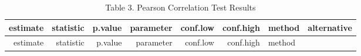 \documentclass[
]{article}
\begin{document}
\begin{longtable}[]{@{}rrrrrrll@{}}
\caption{Table 3. Pearson Correlation Test Results}\tabularnewline
\toprule
\begin{minipage}[b]{0.07\columnwidth}\raggedleft
estimate\strut
\end{minipage} & \begin{minipage}[b]{0.07\columnwidth}\raggedleft
statistic\strut
\end{minipage} & \begin{minipage}[b]{0.06\columnwidth}\raggedleft
p.value\strut
\end{minipage} & \begin{minipage}[b]{0.07\columnwidth}\raggedleft
parameter\strut
\end{minipage} & \begin{minipage}[b]{0.07\columnwidth}\raggedleft
conf.low\strut
\end{minipage} & \begin{minipage}[b]{0.07\columnwidth}\raggedleft
conf.high\strut
\end{minipage} & \begin{minipage}[b]{0.27\columnwidth}\raggedright
method\strut
\end{minipage} & \begin{minipage}[b]{0.09\columnwidth}\raggedright
alternative\strut
\end{minipage}\tabularnewline
\midrule
\endfirsthead
\toprule
\begin{minipage}[b]{0.07\columnwidth}\raggedleft
estimate\strut
\end{minipage} & \begin{minipage}[b]{0.07\columnwidth}\raggedleft
statistic\strut
\end{minipage} & \begin{minipage}[b]{0.06\columnwidth}\raggedleft
p.value\strut
\end{minipage} & \begin{minipage}[b]{0.07\columnwidth}\raggedleft
parameter\strut
\end{minipage} & \begin{minipage}[b]{0.07\columnwidth}\raggedleft
conf.low\strut
\end{minipage} & \begin{minipage}[b]{0.07\columnwidth}\raggedleft
conf.high\strut
\end{minipage} & \begin{minipage}[b]{0.27\columnwidth}\raggedright
method\strut
\end{minipage} & \begin{minipage}[b]{0.09\columnwidth}\raggedright

\end{minipage}
\end{longtable}
\end{document}

